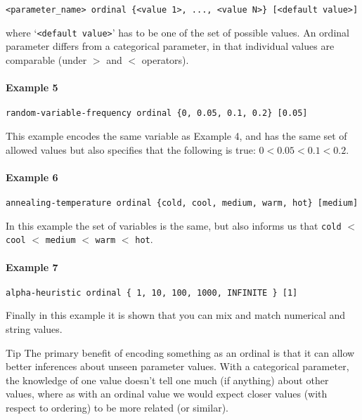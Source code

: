 \documentclass[manual.tex]{subfiles}
\begin{document}
\begin{verbatim}
<parameter_name> ordinal {<value 1>, ..., <value N>} [<default value>]
\end{verbatim}
where `\texttt{<default value>}' has to be one of the set of possible values. An ordinal parameter differs from a categorical parameter, in that individual values are comparable (under $>$ and $<$ operators). 

\paragraph{Example 5}
\begin{verbatim}
random-variable-frequency ordinal {0, 0.05, 0.1, 0.2} [0.05]
\end{verbatim}

This example encodes the same variable as Example 4, and has the same set of allowed values but also specifies that the following is true:
$0 < 0.05 < 0.1 < 0.2$. 

\paragraph{Example 6}
\begin{verbatim}
annealing-temperature ordinal {cold, cool, medium, warm, hot} [medium]
\end{verbatim}

In this example the set of variables is the same, but also informs us that \texttt{cold} $<$ \texttt{cool} $<$ \texttt{medium} $<$ \texttt{warm} $<$ \texttt{hot}.

\paragraph{Example 7}
\begin{verbatim}
alpha-heuristic ordinal { 1, 10, 100, 1000, INFINITE } [1]
\end{verbatim}

Finally in this example it is shown that you can mix and match numerical and string values. 

\vspace{5pt}
\begin{bclogo}[logo=\bclampe, couleurBarre=red, noborder=true]{Tip}
The primary benefit of encoding something as an ordinal is that it can allow better inferences about unseen parameter values. With a categorical parameter, the knowledge of one value doesn't tell one much (if anything) about other values, where as with an ordinal value we would expect closer values (with respect to ordering) to be more related (or similar).
\end{bclogo}
\end{document}

